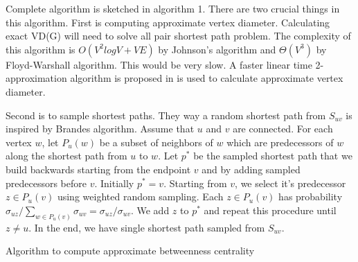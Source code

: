 \documentclass[runningheads,a4paper]{llncs}
\begin{document}
Complete algorithm is sketched in algorithm 1. There are two crucial things in this algorithm. First is computing approximate vertex diameter. Calculating exact VD(G) will need to solve all pair shortest  path problem. The complexity of this algorithm is $O(V^{2}logV + VE)$ by Johnson's algorithm\cite{johnson} and $\Theta(V^{3})$ by Floyd-Warshall algorithm. This would be very slow. A faster linear time 2-approximation algorithm is proposed in \cite{matteo} is used to calculate approximate vertex diameter. 

Second is to sample shortest paths. They way a random shortest path from $S_{uv}$ is inspired by Brandes algorithm\cite{brandes}. Assume that $u$ and $v$ are connected. For each vertex $w$, let $P_{u}(w)$ be a subset of neighbors of $w$ which are predecessors of $w$ along the shortest path from $u$ to $w$. Let $p^{*}$ be the sampled shortest path that we build backwards starting from the endpoint $v$ and by adding sampled predecessors before $v$. Initially $p^{*} = {v}$. Starting from $v$, we select it's predecessor $z \in P_{u}(v)$ using weighted random sampling. Each $z \in P_{u}(v)$ has probability $\sigma_{uz}/\sum_{w \in P_{u}(v)}\sigma_{uv} = \sigma_{uz}/\sigma_{uv}$. We add $z$ to $p^{*}$ and repeat this procedure until $z \neq u$. In the end, we have single shortest path sampled from $S_{uv}$. 
 
\begin{algorithm}
\caption{Algorithm to compute approximate betweenness centrality}
\begin {algorithmic}[1]
\EndFor 
{}
\EndIf
{}
\EndWhile
\EndIf
\EndFor\\
\end{algorithmic}
\end{algorithm}
\end{document}
